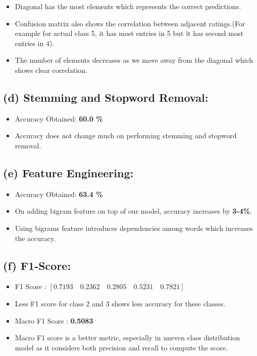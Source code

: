 \documentclass[a4 paper]{article}
\begin{document}
	\begin{itemize}
	\item Diagonal has the most elements which represents the correct predictions.
	\item Confusion matrix also shows the correlation between adjacent ratings.(For example for actual class 5, it has most entries in 5 but it has second most entries in 4).
	\item The number of elements decreases as we move away from the diagonal which shows clear correlation.
	\end{itemize}

\subsection*{(d) Stemming and Stopword Removal:}
	\begin{itemize}
	\item Accuracy Obtained: \textbf{60.0 \%}
	\item Accuracy does not change much on performing stemming and stopword removal.
	\end{itemize}

\subsection*{(e) Feature Engineering:}
	\begin{itemize}
	\item Accuracy Obtained: \textbf{63.4 \%}
	\item On adding bigram feature on top of our model, accuracy increases by \textbf{3-4\%}.
	\item Using bigrams feature introduces dependencies among words which increases the accuracy.
	\end{itemize}

\subsection*{(f) F1-Score:}
	\begin{itemize}
	\item F1 Score : $ [0.7193 \quad 0.2362 \quad 0.2805 \quad 0.5231 \quad 0.7821] $
	\item Less F1 score for class 2 and 3 shows less accuracy for these classes.
	\item Macro F1 Score : \textbf{0.5083}
	\item Macro F1 score is a better metric, especially in uneven class distribution model as it considers both precision and recall to compute the score.
	\end{itemize}
\end{document}
